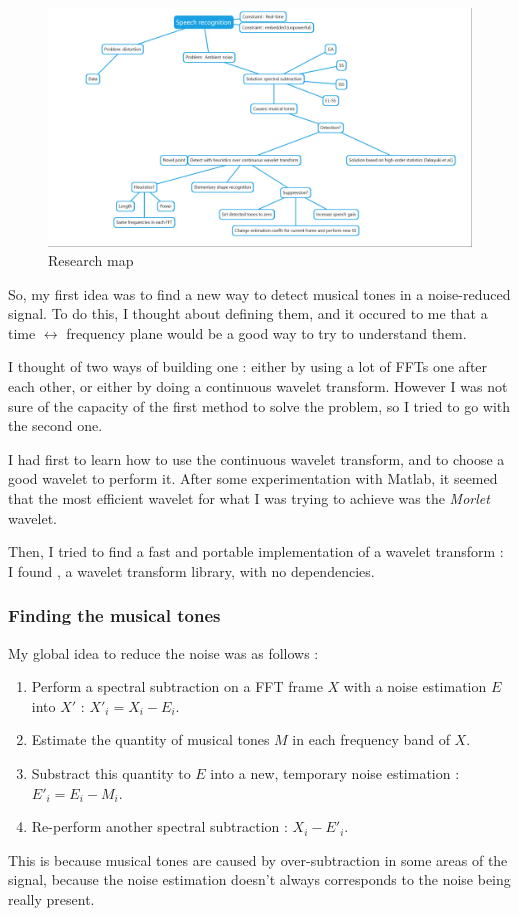 \begin{figure}[H]
\begin{center}
\includegraphics[scale=0.35]{images/mindmap.png}
\caption{Research map}
\label{diag_api_chords}
\end{center}
\end{figure}

So, my first idea was to find a new way to detect musical tones in a noise-reduced signal.
To do this, I thought about defining them, and it occured to me that a time $\longleftrightarrow$ frequency plane would be a good way to try to understand them.

I thought of two ways of building one : either by using a lot of FFTs one after each other, or either by doing a continuous wavelet transform. However I was not sure of the capacity of the first method to solve the problem, so I tried to go with the second one.

I had first to learn how to use the continuous wavelet transform, and to choose a good wavelet to perform it. After some experimentation with Matlab, it seemed that the most efficient wavelet for what I was trying to achieve was the \textit{Morlet} wavelet. 

Then, I tried to find a fast and portable implementation of a wavelet transform : I found , a  wavelet transform library, with no dependencies.

\subsubsection{Finding the musical tones}
My global idea to reduce the noise was as follows : 
\begin{enumerate}
\item Perform a spectral subtraction on a FFT frame $X$ with a noise estimation $E$ into $X'$ : $X'_i = X_i - E_i$.
\item Estimate the quantity of musical tones $M$ in each frequency band of $X$.
\item Substract this quantity to $E$ into a new, temporary noise estimation : $E'_i = E_i - M_i$.
\item Re-perform another spectral subtraction : $X_i - E'_i$.
\end{enumerate}
This is because musical tones are caused by over-subtraction in some areas of the signal, because the noise estimation doesn't always corresponds to the noise being really present. 

